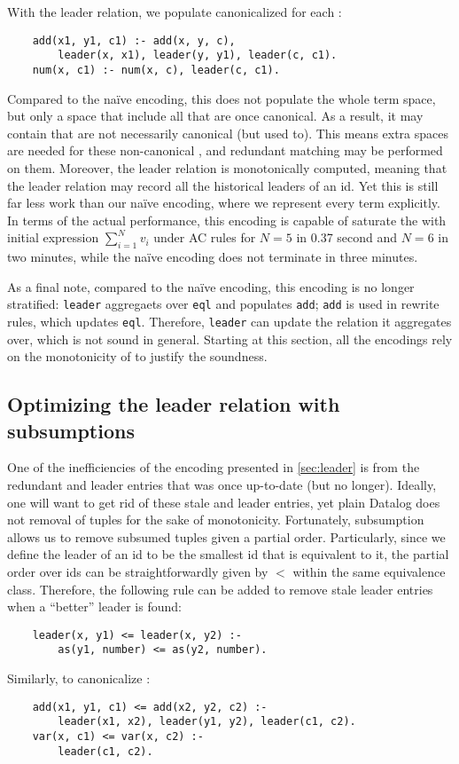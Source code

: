 With the leader relation, 
 we populate canonicalized \enodes 
 for each \enode:
\begin{verbatim}
    add(x1, y1, c1) :- add(x, y, c), 
        leader(x, x1), leader(y, y1), leader(c, c1).
    num(x, c1) :- num(x, c), leader(c, c1).
\end{verbatim}
Compared to the na\"ive encoding,
 this does not populate the whole term space,
 but only a space that include all \enodes that are once canonical.
As a result,
 it may contain \enodes that are not necessarily canonical (but used to).
This means extra spaces are needed for these non-canonical \enodes,
 and redundant matching may be performed on them.
Moreover, the leader relation is monotonically computed,
 meaning that the leader relation may 
 record all the historical leaders of an \eclass id.
Yet this is still far less work than our na\"ive encoding, 
 where we represent every term explicitly.
In terms of the actual performance,
 this encoding is capable of saturate 
 the \egraph with initial expression $\sum_{i=1}^Nv_i$
 under AC rules for $N=5$ in 0.37 second
 and $N=6$ in two minutes, 
 while the na\"ive encoding does not terminate in three minutes.

As a final note,
 compared to the na\"ive encoding,
 this encoding is no longer stratified:
 \verb|leader| aggregaets over \verb|eql|
 and populates \verb|add|;
 \verb|add| is used in rewrite rules,
 which updates \verb|eql|.
Therefore, \verb|leader| can update the relation it aggregates over,
 which is not sound in general.
Starting at this section,
 all the encodings rely on the monotonicity of \egraphs to justify the soundness.

\subsection{Optimizing the leader relation with subsumptions}\label{sec:subsumption}

One of the inefficiencies of the encoding presented in \autoref{sec:leader} is 
 from the redundant \enodes and leader entries 
 that was once up-to-date (but no longer).
Ideally, one will want to get rid of these stale \enodes and leader entries,
 yet plain Datalog does not removal of tuples for the sake of monotonicity.
Fortunately,
 subsumption allows us to remove subsumed tuples given a partial order.
Particularly, 
 since we define the leader of an \eclass id to be the smallest id 
 that is equivalent to it,
 the partial order over \eclass ids can be straightforwardly given by $<$ 
 within the same equivalence class.
Therefore, the following rule can be added to remove stale leader entries 
 when a ``better'' leader is found:
\begin{verbatim}
    leader(x, y1) <= leader(x, y2) :-
        as(y1, number) <= as(y2, number).
\end{verbatim}
Similarly, to canonicalize \enodes:
\begin{verbatim}
    add(x1, y1, c1) <= add(x2, y2, c2) :-
        leader(x1, x2), leader(y1, y2), leader(c1, c2).
    var(x, c1) <= var(x, c2) :-
        leader(c1, c2).
\end{verbatim}


